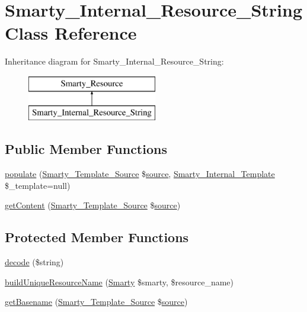 \hypertarget{class_smarty___internal___resource___string}{}\section{Smarty\+\_\+\+Internal\+\_\+\+Resource\+\_\+\+String Class Reference}
\label{class_smarty___internal___resource___string}
Inheritance diagram for Smarty\+\_\+\+Internal\+\_\+\+Resource\+\_\+\+String\+:\begin{figure}[H]
\begin{center}
\leavevmode
\includegraphics[height=2.000000cm]{class_smarty___internal___resource___string}
\end{center}
\end{figure}
\subsection*{Public Member Functions}
\begin{DoxyCompactItemize}
\item 
\hyperlink{class_smarty___internal___resource___string_a07a771f460d625d63fcb72d0aeed0b01}{populate} (\hyperlink{class_smarty___template___source}{Smarty\+\_\+\+Template\+\_\+\+Source} \$\hyperlink{class_smarty___resource_ab6ac6b66dac2da6c41a178102f7d53e4}{source}, \hyperlink{class_smarty___internal___template}{Smarty\+\_\+\+Internal\+\_\+\+Template} \$\+\_\+template=null)
\item 
\hyperlink{class_smarty___internal___resource___string_a0e40116a3d4f59cf7ea39f83441169b8}{get\+Content} (\hyperlink{class_smarty___template___source}{Smarty\+\_\+\+Template\+\_\+\+Source} \$\hyperlink{class_smarty___resource_ab6ac6b66dac2da6c41a178102f7d53e4}{source})
\end{DoxyCompactItemize}
\subsection*{Protected Member Functions}
\begin{DoxyCompactItemize}
\item 
\hyperlink{class_smarty___internal___resource___string_a9fb211ee74fee3ad085661da46aa220f}{decode} (\$string)
\item 
\hyperlink{class_smarty___internal___resource___string_acadaf10ca33c215a82372c1144f0fe4a}{build\+Unique\+Resource\+Name} (\hyperlink{class_smarty}{Smarty} \$smarty, \$resource\+\_\+name)
\item 
\hyperlink{class_smarty___internal___resource___string_a91cdf7da12bdc51906539506dd26159b}{get\+Basename} (\hyperlink{class_smarty___template___source}{Smarty\+\_\+\+Template\+\_\+\+Source} \$\hyperlink{class_smarty___resource_ab6ac6b66dac2da6c41a178102f7d53e4}{source})
\end{DoxyCompactItemize}
